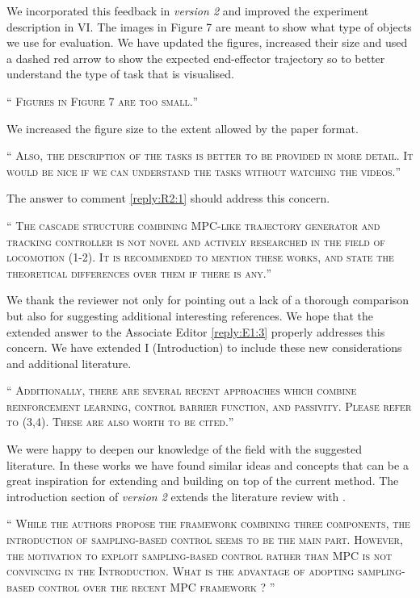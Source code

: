 \documentclass[10pt]{article}
\newcommand{\referee}[1]{\;
  \begin{minipage}[t]{.95\textwidth}
    ``{\small\color{red} \textsc{#1}}''
  \end{minipage}\medskip
  }
\newcommand{\version}[1]{\textit{version #1}}
\begin{document}
\begin{enumerate}[label={[R2:\,\arabic{enumi}]}]
We incorporated this feedback in \version{2} and improved the experiment description in \sect VI. The images in Figure 7 are meant to show what type of objects we use for evaluation. We have updated the figures, increased their size and used a dashed red arrow to show the expected end-effector trajectory so to better understand the type of task that is visualised.

\item\label{reply:R2:2} \referee{Figures in Figure 7 are too small.}

We increased the figure size to the extent allowed by the paper format.

\item\label{reply:R2:3} 
\referee{Also, the description of the tasks is better to be provided in more detail. It would be nice if we can understand the tasks without watching the videos.}

The answer to comment \ref{reply:R2:1} should address this concern.

\item\label{reply:R2:4} 
\referee{The cascade structure combining MPC-like trajectory generator and tracking controller is not novel and actively researched in the field of locomotion (1-2). It is recommended to mention these works, and state the theoretical differences over them if there is any.}

We thank the reviewer not only for pointing out a lack of a thorough comparison but also for suggesting additional interesting references. 
We hope that the extended answer to the Associate Editor \ref{reply:E1:3} properly addresses this concern. We have extended \sect I (Introduction) to include these new considerations and additional literature.

\item\label{reply:R2:5} 
\referee{Additionally, there are several recent approaches which combine reinforcement learning, control barrier function, and passivity. Please refer to (3,4). These are also worth to be cited.}

We were happy to deepen our knowledge of the field with the suggested literature. In these works we have found similar ideas and concepts that can be a great inspiration for extending and building on top of the current method. The introduction section of \version{2} extends the literature review with \cite{cheng2019end, choi2020reinforcement}.

\item\label{reply:R2:6} 
\referee{While the authors propose the framework combining three components, the introduction of sampling-based control seems to be the main part. However, the motivation to exploit sampling-based control rather than MPC is not convincing in the Introduction. What is the advantage of adopting sampling-based control over the recent MPC framework \cite{minniti2019whole}?
}


\end{enumerate}
\end{document}
